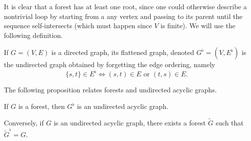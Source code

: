 It is clear that a forest has at least one root, since one could
otherwise describe a nontrivial loop by starting from a any
vertex and passing to its parent until the sequence self-intersects
(which must happen since $V$ is finite). We will use the following definition.

\begin{definition}
\label{def:flattened}
If $G=(V,E)$ is a directed graph, its flattened graph, denoted $G^\flat=(V,E^\flat)$ is the  undirected graph obtained by forgetting the edge ordering,
namely
$$
\{s,t\}\in E^\flat \Leftrightarrow (s,t)\in E \text{ or } (t,s)\in E.
$$
\end{definition}

The following proposition relates forests and
undirected acyclic graphs.
\begin{proposition}
\label{prop:undir.ac}
If $G$ is a forest, then $G^\flat$ is an undirected acyclic graph.

Conversely, if $G$ is an undirected acyclic graph, there exists a forest $\tilde
G$ such that $\tilde G^\flat = G$.
\end{proposition}
